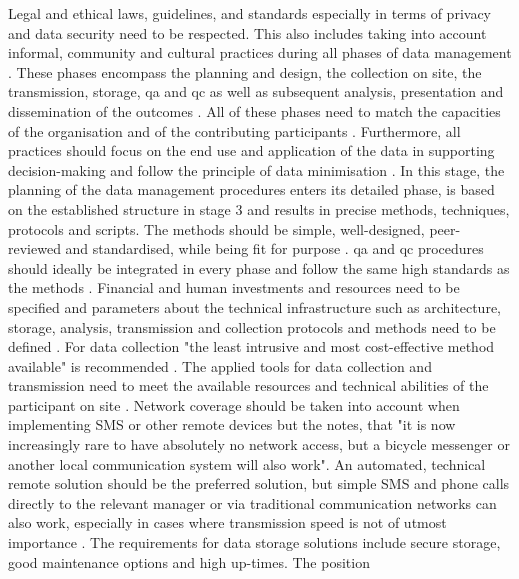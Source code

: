 Legal and ethical laws, guidelines, and standards especially in terms of privacy and data security need to be respected. This also includes taking into account informal, community and cultural practices during all phases of data management \autocite[017]{ifrcCommunityBasedSurveillanceGuiding2017}. These phases encompass the planning and design, the collection on site, the transmission, storage, \acrfull{qa} and \acrfull{qc} as well as subsequent analysis, presentation and dissemination of the outcomes \autocite{fraislCitizenScienceEnvironmental2022}.\newline
All of these phases need to match the capacities of the organisation and of the contributing participants \autocite{ifrcCommunityBasedSurveillanceGuiding2017,minkmanCitizenScienceWater2015}. Furthermore, all practices should focus on the end use and application of the data in supporting decision-making and follow the principle of data minimisation \autocite{edpsGlossaryEuropeanData2023,ifrcCommunityBasedSurveillanceGuiding2017,minkmanCitizenScienceWater2015}. In this stage, the planning of the data management procedures enters its detailed phase, is based on the established structure in stage 3 and results in precise methods, techniques, protocols and scripts. The methods should be simple, well-designed, peer-reviewed and standardised, while being fit for purpose \autocite{fraislCitizenScienceEnvironmental2022,ifrcCommunityBasedSurveillanceGuiding2017,silvertownNewDawnCitizen2009,whitelawEstablishingCanadianCommunity2003}. \acrshort{qa} and \acrshort{qc} procedures should ideally be integrated in every phase and follow the same high standards as the methods \autocite{fraislCitizenScienceEnvironmental2022,mackechnieRoleBigSociety2011,sharpeCommunityBasedEcological2006,silvertownNewDawnCitizen2009}. Financial and human investments and resources need to be specified and parameters about the technical infrastructure such as architecture, storage, analysis, transmission and collection protocols and methods need to be defined \autocite{fraislCitizenScienceEnvironmental2022,sharpeCommunityBasedEcological2006}. For data collection "the least intrusive and most cost-effective method available" is recommended \autocite[27]{ifrcCommunityBasedSurveillanceGuiding2017}. The applied tools for data collection and transmission need to meet the available resources and technical abilities of the participant on site \autocite{ifrcCommunityBasedSurveillanceGuiding2017,minkmanCitizenScienceWater2015}. Network coverage should be taken into account when implementing SMS or other remote devices but the \autocite[26]{ifrcCommunityBasedSurveillanceGuiding2017} notes, that "it is now increasingly rare to have absolutely no network access, but a bicycle messenger or another local communication system will also work". An automated, technical remote solution should be the preferred solution, but simple SMS and phone calls directly to the relevant manager or via traditional communication networks can also work, especially in cases where transmission speed is not of utmost importance \autocite{gualazziniEWEAEarlyWarning2021,ifrcCommunityBasedSurveillanceGuiding2017}. The requirements for data storage solutions include secure storage, good maintenance options and high up-times. The position 